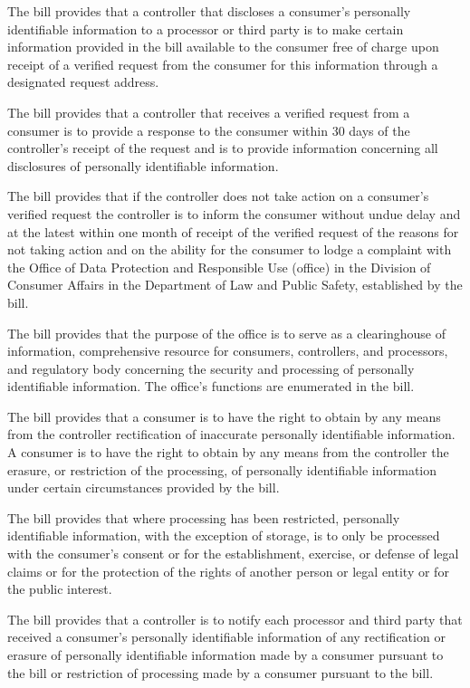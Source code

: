      The bill provides that a controller that discloses a consumer's personally identifiable information to a processor or third party is to make certain information provided in the bill available to the consumer free of charge upon receipt of a verified request from the consumer for this information through a designated request address.

     The bill provides that a controller that receives a verified request from a consumer is to provide a response to the consumer within 30 days of the controller's receipt of the request and is to provide information concerning all disclosures of personally identifiable information.

     The bill provides that if the controller does not take action on a consumer's verified request the controller is to inform the consumer without undue delay and at the latest within one month of receipt of the verified request of the reasons for not taking action and on the ability for the consumer to lodge a complaint with the Office of Data Protection and Responsible Use (office) in the Division of Consumer Affairs in the Department of Law and Public Safety, established by the bill.

     The bill provides that the purpose of the office is to serve as a clearinghouse of information, comprehensive resource for consumers, controllers, and processors, and regulatory body concerning the security and processing of personally identifiable information. The office's functions are enumerated in the bill.

     The bill provides that a consumer is to have the right to obtain by any means from the controller rectification of inaccurate personally identifiable information. A consumer is to have the right to obtain by any means from the controller the erasure, or restriction of the processing, of personally identifiable information under certain circumstances provided by the bill.

     The bill provides that where processing has been restricted, personally identifiable information, with the exception of storage, is to only be processed with the consumer's consent or for the establishment, exercise, or defense of legal claims or for the protection of the rights of another person or legal entity or for the public interest.

     The bill provides that a controller is to notify each processor and third party that received a consumer's personally identifiable information of any rectification or erasure of personally identifiable information made by a consumer pursuant to the bill or restriction of processing made by a consumer pursuant to the bill.

